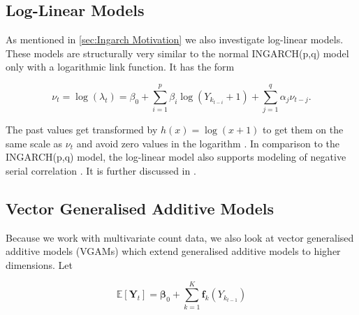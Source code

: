 \subsection{Log-Linear Models}
\label{sec: Log-Linear Models}

As mentioned in \ref{sec:Ingarch Motivation} we also investigate log-linear models. These models are structurally very similar to the normal INGARCH(p,q) model only with a logarithmic link function. It has the form 

\begin{equation}
\nu_t= \log(\lambda_t) = \beta_0 + \sum_{i=1}^p\beta_i \log(Y_{k_{t-i}}+1) + \sum_{j=1}^q\alpha_j \nu_{t-j}.
\label{eq:Log-Linear model}
\end{equation}

The past values get transformed by $h(x)=\log(x+1)$ to get them on the same scale as $\nu_t$ and avoid zero values in the logarithm \cite{Liboschik:2016,Fokianos:2011}. In comparison to the INGARCH(p,q) model, the log-linear model also supports modeling of negative serial correlation \cite{Liboschik:2016}. It is further discussed in \cite{Fokianos:2011,Woodard:2011,Douc:2013}.


\subsection{Vector Generalised Additive Models}
\label{sec:Vgam}

Because we work with multivariate count data, we also look at vector generalised additive models (VGAMs) which extend generalised additive models to higher dimensions. Let 

\begin{equation}
\mathbb{E}[\bm{Y}_t] = \bm{\beta}_0 + \sum_{k=1}^K\bm{f}_k(Y_{k_{t-1}})
\label{eq:}
\end{equation}